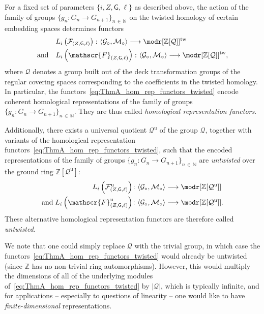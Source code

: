 \documentclass[AHL,Unicode,published]{cedram}
\newcommand{\tw}{\mathrm{tw}}
\newcommand{\unt}{\mathrm{u}}
\newcommand{\sF}{\mathscr{F}}
\newcommand{\sG}{\mathsf{G}}
\newcommand{\cF}{\mathcal{F}}
\newcommand{\cG}{\mathcal{G}}
\newcommand{\cM}{\mathcal{M}}
\newcommand{\cQ}{\mathcal{Q}}
\newcommand{\bN}{\mathbb{N}}
\newcommand{\bZ}{\mathbb{Z}}
\newcommand{\too}{\ensuremath{\longrightarrow}}
\begin{document}
\begin{theo}\label{athm:thm_A}
For a fixed set of parameters $\{i,Z,\sG,\ell\}$ as described above, the action of the family of groups $\{g_{n} \colon G_{n} \to G_{n+1}\}_{n\,\in\,\bN}$ on the twisted homology of certain embedding spaces determines functors
\begin{equation}
\label{eq:ThmA_hom_rep_functors_twisted}
\begin{split}
&L_{i}\left(\cF_{(Z,\sG,\ell)}\right)\colon \langle \cG_{\circ}, \cM_{\circ} \rangle \too \modr[\bZ[\cQ]]^{\tw} \\
\text{and} \quad &L_{i}\left(\sF_{(Z,\sG,\ell)}\right)\colon \langle \cG_{\circ}, \cM_{\circ} \rangle \too \modr[\bZ[\cQ]]^{\tw},
\end{split}
\end{equation}
where $\cQ$ denotes a group built out of the deck transformation groups of the regular covering spaces corresponding to the coefficients in the twisted homology. In particular, the functors~\eqref{eq:ThmA_hom_rep_functors_twisted} encode coherent homological representations of the family of groups $\{g_{n} \colon G_{n} \to G_{n+1}\}_{n\,\in\,\bN}$. They are thus called \emph{homological representation functors}.

Additionally, there exists a universal quotient $\cQ^{\unt}$ of the group $\cQ$, together with variants of the homological representation functors~\eqref{eq:ThmA_hom_rep_functors_twisted}, such that the encoded representations of the family of groups $\{g_{n} \colon G_{n} \to G_{n+1}\}_{n\,\in\,\bN}$ are \emph{untwisted} over the ground ring $\bZ[\cQ^{\unt}]$:
\begin{equation}\label{eq:ThmA_hom_rep_functors_untwisted}
\begin{split}
L_{i}\left(\cF^{\unt}_{(Z,\sG,\ell)}\right) &\colon \langle \cG_{\circ}, \cM_{\circ} \rangle \too \modr[\bZ[\cQ^{\unt}]] \\
\text{and}\;
L_{i}\left(\sF^{\unt}_{(Z,\sG,\ell)}\right) &\colon \langle \cG_{\circ}, \cM_{\circ} \rangle \too \modr[\bZ[\cQ^{\unt}]].
\end{split}
\end{equation}
These alternative homological representation functors are therefore called \emph{untwisted}.
\end{theo}

We note that one could simply replace $\cQ$ with the trivial group, in which case the functors~\eqref{eq:ThmA_hom_rep_functors_twisted} would already be untwisted (since $\bZ$ has no non-trivial ring automorphisms). However, this would multiply the dimensions of all of the underlying modules of~\eqref{eq:ThmA_hom_rep_functors_twisted} by $| \cQ |$, which is typically infinite, and for applications -- especially to questions of linearity -- one would like to have \emph{finite-dimensional} representations.
\end{document}
